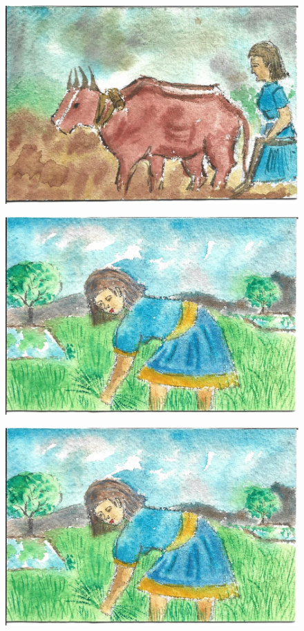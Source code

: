\documentclass[12pt]{article}
\begin{document}
\begin{figure}[h!]
\centering
\includegraphics[width=.7\paperwidth]{pictures/LP}
\end{figure}

\newpage

\begin{figure}[h!]
\centering
\includegraphics[width=.7\paperwidth]{pictures/LW}
\end{figure}

\newpage

\begin{figure}[h!]
\centering
\includegraphics[width=.7\paperwidth]{pictures/LW}
\end{figure}
\end{document}
